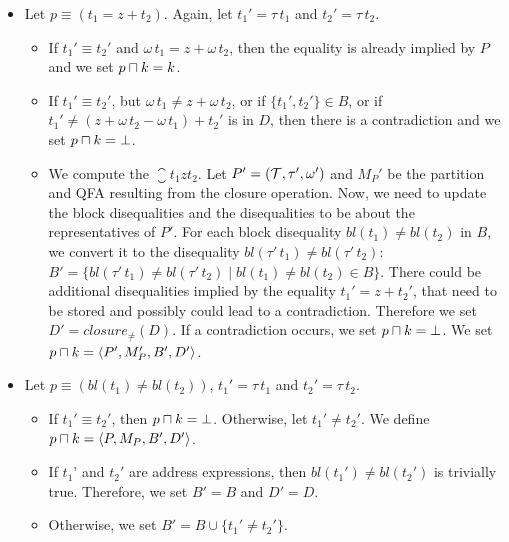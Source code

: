 \begin{itemize}
    \item Let $p \equiv (t_1 = z + t_2)$. Again, let $t_1'=\tau\,t_1$ and $t_2'=\tau\,t_2$.
    \begin{itemize}
        \item If $t_1' \equiv t_2'$ and $\omega\,t_1 = z + \omega\,t_2$,
        then the equality is already implied by $P$ and we set $p \sqcap k = k$.
        \item If $t_1' \equiv t_2'$, but $\omega\,t_1 \neq z + \omega\,t_2$,
        or if $\{t_1',t_2'\}\in B$, or if $t_1' \neq (z + \omega\,t_2 - \omega\,t_1) + t_2'$ is in $D$,
        then there is a contradiction and we set $p \sqcap k = \bot$.
        \item We compute the $\closure{t_1}{z}{t_2}$.
        Let $P' = (\mathcal{T}, \tau', \omega')$ and $M_P'$ be the partition and QFA resulting from the closure operation.
        Now, we need to update the block disequalities and the disequalities to be about the representatives of $P'$.
        For each block disequality $bl(t_1) \neq bl(t_2)$ in $B$, we convert it to the disequality $bl(\tau'\,t_1) \neq bl(\tau'\,t_2)$:
        $B' = \{bl(\tau'\,t_1) \neq bl(\tau'\,t_2) \mid bl(t_1) \neq bl(t_2) \in B\}$.
        There could be additional disequalities implied by the equality $t_1' = z + t_2'$, that need to be stored and
        possibly could lead to a contradiction.
        Therefore we set $D' = closure_\neq(D)$. 
        If a contradiction occurs, we set $p \sqcap k = \bot$.
        We set $p \sqcap k = \langle P',M_P',B',D'\rangle$.
    \end{itemize}
    \item Let $p \equiv (bl(t_1) \neq bl(t_2))$, $t_1'=\tau\,t_1$ and $t_2'=\tau\,t_2$.
    \begin{itemize}
        \item If $t_1' \equiv t_2'$, then $p \sqcap k = \bot$.
         Otherwise, let $t_1' \neq t_2'$. We define $p \sqcap k = \langle P,M_P,B', D'\rangle$.
         \item If $t_1$' and $t_2'$ are address expressions, then $bl(t_1') \neq bl(t_2')$ is trivially true.
          Therefore, we set $B'= B$ and $D'=D$. 
          \item Otherwise, we set $B' = B \cup \{t_1' \neq t_2'\}$.

\end{itemize}
\end{itemize}
